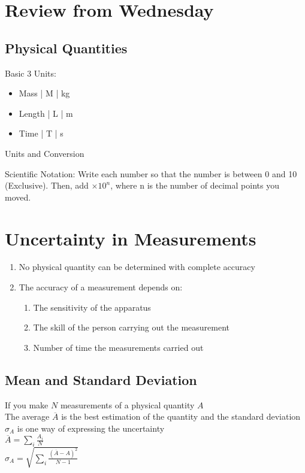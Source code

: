 \documentclass[]{article}
\date{Friday, January 20\textsuperscript{th}, 2023}
\title{\docTitle}
\author{\docAuthor}
\date{\today}
\begin{document}
\maketitle
\section*{Review from Wednesday}
\subsection*{Physical Quantities}
Basic 3 Units:
\begin{itemize}
    \item Mass | M | kg
    \item Length | L | m
    \item Time | T | s
\end{itemize}

Units and Conversion

Scientific Notation:
Write each number so that the number is between 0 and 10 (Exclusive). Then, add $\times 10^n$, where n is the number of decimal points you moved.



\section*{Uncertainty in Measurements}
\begin{enumerate}
    \item No physical quantity can be determined with complete accuracy
    \item The accuracy of a measurement depends on:
        \begin{enumerate}
            \item The sensitivity of the apparatus
            \item The skill of the person carrying out the measurement
            \item Number of time the measurements carried out
        \end{enumerate}
\end{enumerate}
\subsection*{Mean and Standard Deviation}
If you make $N$ measurements of a physical quantity $A$\\
The average $\overline{A}$ is the best estimation of the quantity and the standard deviation $\sigma_{A}$ is one way of expressing the uncertainty\\
$\overline{A} = \sum_{i}\frac{A_{i}}{N}$\\
$\sigma_{A} = \sqrt{\sum_{i}\frac{(\overline{A} - A)^2}{N-1}}$
\end{document}
